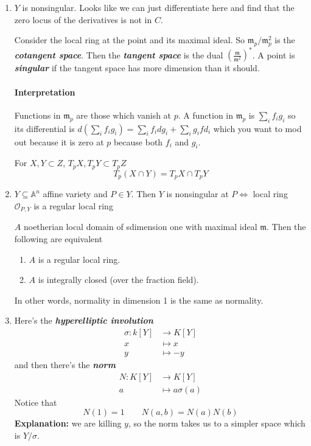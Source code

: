 \begin{enumerate}[label=\textbf{Step \arabic*}]
	\item $Y$ is nonsingular. Looks like we can just differentiate here and find that the zero locus of the derivatives is not in $C$.
\begin{defn}
	Consider the local ring at the point and its maximal ideal. So $\mathfrak{m}_{p}/\mathfrak{m}^2_p$ is the \textit{\textbf{cotangent space}}. Then the  \textit{\textbf{tangent space}} is the dual  $\left(\frac{\mathfrak{m}}{\mathfrak{m}^2}\right)^*$. A point is \textit{\textbf{singular}} if the tangent space has more dimension than it should.
\end{defn}

\paragraph{Interpretation} Functions in $\mathfrak{m}_p$ are those which vanish at $p$. A function in $\mathfrak{m}_{p}$ is $\sum_{i}f_ig_i$ so its differential is $ d \left( \sum_{i}f_ig_i \right) =\sum_{i}f_idg_i+\sum_{i}g_ifd_i$ which you want to mod out because it is zero at $p$ because both $f_{i}$ and $g_{i}$.

\begin{remark}
	For $X,Y\subset Z$, $T_pX,T_pY\subset T_pZ$
	\[T_p(X\cap Y)=T_pX\cap T_pY\]
\end{remark}

\item 
	\begin{thm}[5.1]\leavevmode
		$Y\subseteq \mathbb{A}^n$ affine variety and $P\in Y$. Then $Y$ is nonsingular at $P \iff $ local ring $\mathcal{O}_{P,Y}$ is a regular local ring
	\end{thm}
	\begin{thm}[6.2A]\leavevmode
		$A$ noetherian local domain of sdimension one with maximal ideal $\mathfrak{m}$. Then the following are equivalent
		\begin{enumerate}[label=(\roman*)]
			\item $A$ is a regular local ring.
			\item $A$ is integrally closed (over the fraction field).
		\end{enumerate}
	\end{thm}
	In other words, normality in dimension 1 is the same as normality.

	\item Here's the \textit{\textbf{hyperelliptic involution}}
		\begin{align*}
			\sigma: k[Y] &\longrightarrow K[Y] \\
		x &\longmapsto x\\
		y&\longmapsto-y
	\end{align*}
	and then there's the \textit{\textbf{norm}}
	\begin{align*}
		N: K[Y] &\longrightarrow K[Y] \\
		a&\longmapsto a\sigma(a)
	\end{align*}
	Notice that
	\[N(1)=1\qquad N(a,b)=N(a)N(b)\]
	\textbf{Explanation:} we are killing $y$, so the norm takes us to a simpler space which is $Y/\sigma$.


\end{enumerate}
